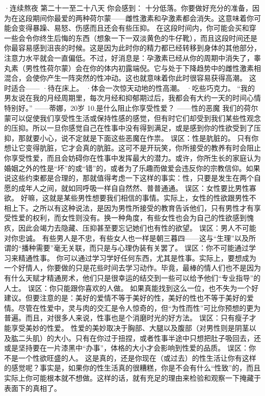 \documentclass[12pt,UTF8]{ctexbook}
\begin{document}
·连续熬夜
第二十一至二十八天
你会感到：
十分低落。你要做好充分的准备，因为在这段期间你最爱的两种荷尔蒙——雌性激素和孕激素都会消失。这意味着你可能会变得暴躁、易怒、伤感而且还会有些压抑。
在这段时间内，你可能会买和穿一些会令你终生后悔的东西（想象一下一双淡黄色的牛仔靴），而且这段时间还是你最容易感到沮丧的时候。这是因为此时你的精力都已经转移到身体的其他部分，注意力水平就会一直偏低。不过，好消息是：孕激素已经从你的周期中消失了，睾丸素（男性性荷尔蒙）会在你的体内初露端倪。它与处于下降趋势中的雌性激素相混合，会使你产生一阵突然的性冲动。这也就意味着你此时很容易获得高潮。
这时适合——
·待在床上。
·体会一次惊天动地的性高潮。
·吃些巧克力。
“我的男友说在我的月经周期里，每次月经和抑郁期过后，我都会有大约一天的时间心情特别好。”
——蒂娜，20岁
10.是什么阻止你享受性爱？
——性的恶魔
我们的荷尔蒙可以促使我们享受性生活或保持性感的感觉，但有时它们却受到我们某些性观念的压抑。所以一旦你感觉自己在性事中没有得到满足，或是感到你的性欲受到了压抑，那就要小心，说不定就是下面这些恶魔在作祟。
误区：性是肮脏的。
只有你想让它变得肮脏，它才会真的肮脏。这可不是开玩笑，你所接受的教养有时会阻止你享受性爱，而且会妨碍你在性事中发挥最大的潜力。或许，你所生长的家庭认为婚姻之外的性是“坏”的或“错”的，或者为了乐趣而做爱会违反你的宗教信仰。如果说这些约束都是合理的，那就值得考虑一下这样的事实：性，只要是发生在两个自愿的成年人之间，就如同呼吸一样自自然然、普普通通。
误区：女性要比男性寡欲。
好嘛，这就是某些男性想要我们相信的事情。实际上，女性的性欲跟男性不相上下。之所以有这种说法，是因为男性所接受的教育告诉他们，只有男性才有享受性爱的权利，而女性则没有。换一种角度，有些女性也会为自己的性欲感到愧疚，因此会竭力去隐藏、压抑甚至要忘记她们也有性的欲望。
误区：男人不可能对你忠诚。
有些男人是不忠，有些女人也一样是朝三暮四——这与“生理”以及所谓的“播种需要”毫无关联，而只是与心理伪装有关罢了。
误区：你不可能通过学习来精通性事。
你可以通过学习学好任何东西，尤其是性事。实际上，要想成为一个好情人，你要做的只是花些时间去学习动作。毕竟，最棒的情人们也不是因为有什么天赋才精通房术，他们只是很幸运的结交到一些可以给予他们“专业指导”的人士。
误区：你只能跟你喜欢的人做。
如果真能找到这么一位，也不失为一个好建议。但要注意的是：美好的爱情不等于美好的性，美好的性也不等于美好的爱情。尽管在性爱中，灵与肉的交汇是令人惊奇的，但“为性而性”可比你预想的更为普遍。而且，对很多人来说，性事也是个消磨时光的好方法。
误区：只有瘦子才能享受美妙的性爱。
性爱的美妙取决于胸部、大腿以及腹部（对男性则是阴茎以及肱二头肌）的大小。只有在你过于扭捏，或者性事半途中只想把肚子吸回去，还或是坚持要在一片漆黑中“办事”，体格的大小才会影响到性爱的品质。
误区：你不是一个性欲旺盛的人。
这是真的，还是你现在（或过去）的性生活让你有这样的感觉呢？事实是，如果你的性生活真的很糟糕，你是不会有什么“性致”的，而且实际上你可能根本就不想做。这样的话，就有充足的理由来检验和观察一下掩藏于表面下的真相了。
\end{document}

